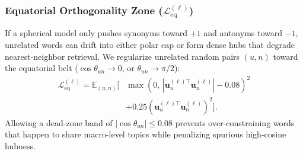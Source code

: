 \documentclass[journal]{IEEEtran}
\begin{document}
\subsubsection{Equatorial Orthogonality Zone ($\mathcal{L}_{\text{eq}}^{(\ell)}$)}
If a spherical model only pushes synonyms toward $+1$ and antonyms toward $-1$, unrelated words can drift into either polar cap or form dense hubs that degrade nearest-neighbor retrieval. We regularize unrelated random pairs $(u, n)$ toward the equatorial belt ($\cos\theta_{un} \to 0$, or $\theta_{un} \to \pi/2$):
\begin{equation}
\begin{aligned}
\mathcal{L}_{\text{eq}}^{(\ell)} = \mathbb{E}_{(u,n)}\Big[ &\max\!\left(0, \, \left|\mathbf{u}_u^{(\ell)\top}\mathbf{u}_n^{(\ell)}\right| - 0.08\right)^2 \\
&+ 0.25\left(\mathbf{u}_u^{(\ell)\top}\mathbf{u}_n^{(\ell)}\right)^2 \Big].
\end{aligned}
\label{eq:loss_eq}
\end{equation}
Allowing a dead-zone band of $|\cos\theta_{un}| \le 0.08$ prevents over-constraining words that happen to share macro-level topics while penalizing spurious high-cosine hubness.
\end{document}
